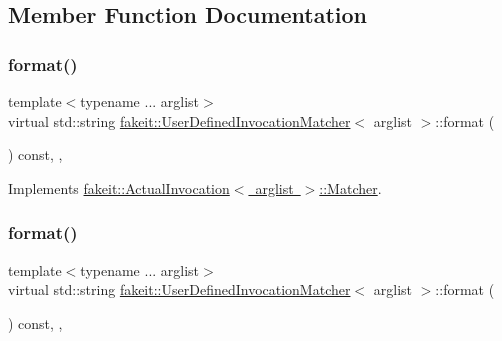 \subsection{Member Function Documentation}
\mbox{\label{structfakeit_1_1UserDefinedInvocationMatcher_a8090f8ab0af9c775f833e725f4414368}} 
\subsubsection{\texorpdfstring{format()}{format()}\hspace{0.1cm}{\footnotesize\ttfamily [1/9]}}
{\footnotesize\ttfamily template$<$typename ... arglist$>$ \\
virtual std\+::string \mbox{\hyperlink{structfakeit_1_1UserDefinedInvocationMatcher}{fakeit\+::\+User\+Defined\+Invocation\+Matcher}}$<$ arglist $>$\+::format (\begin{DoxyParamCaption}{ }\end{DoxyParamCaption}) const\hspace{0.3cm}{\ttfamily [inline]}, {\ttfamily [override]}, {\ttfamily [virtual]}}



Implements \mbox{\hyperlink{structfakeit_1_1ActualInvocation_1_1Matcher_ae19e50f7b3a2cd2a9d6670acbaa47c32}{fakeit\+::\+Actual\+Invocation$<$ arglist $>$\+::\+Matcher}}.

\mbox{\label{structfakeit_1_1UserDefinedInvocationMatcher_a8090f8ab0af9c775f833e725f4414368}} 
\subsubsection{\texorpdfstring{format()}{format()}\hspace{0.1cm}{\footnotesize\ttfamily [2/9]}}
{\footnotesize\ttfamily template$<$typename ... arglist$>$ \\
virtual std\+::string \mbox{\hyperlink{structfakeit_1_1UserDefinedInvocationMatcher}{fakeit\+::\+User\+Defined\+Invocation\+Matcher}}$<$ arglist $>$\+::format (\begin{DoxyParamCaption}{ }\end{DoxyParamCaption}) const\hspace{0.3cm}{\ttfamily [inline]}, {\ttfamily [override]}, {\ttfamily [virtual]}}



